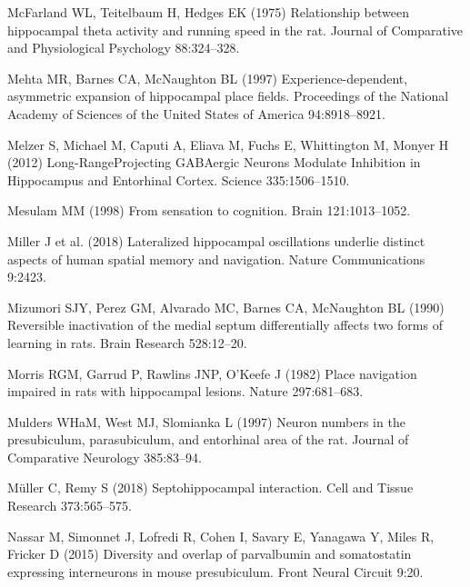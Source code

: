 \documentclass[
  12pt,
  a4paper,
  openany]{book}
\newlength{\cslhangindent}
\newlength{\cslentryspacingunit} %
\newenvironment{CSLReferences}[2] %
 {%
  \setlength{\parindent}{0pt}
  \ifodd #1
  \let\oldpar\par
  \def\par{\hangindent=\cslhangindent\oldpar}
  \fi
  \setlength{\parskip}{#2\cslentryspacingunit}
 }%
 {}
\begin{document}
\begin{CSLReferences}{1}{0}
\leavevmode{}%
McFarland WL, Teitelbaum H, Hedges EK (1975) Relationship between hippocampal theta activity and running speed in the rat. Journal of Comparative and Physiological Psychology 88:324--328.

\leavevmode{}%
Mehta MR, Barnes CA, McNaughton BL (1997) Experience-dependent, asymmetric expansion of hippocampal place fields. Proceedings of the National Academy of Sciences of the United States of America 94:8918--8921.

\leavevmode{}%
Melzer S, Michael M, Caputi A, Eliava M, Fuchs E, Whittington M, Monyer H (2012) Long-{Range}{\textendash}{Projecting} {GABAergic} {Neurons} {Modulate} {Inhibition} in {Hippocampus} and {Entorhinal} {Cortex}. Science 335:1506--1510.

\leavevmode{}%
Mesulam MM (1998) From sensation to cognition. Brain 121:1013--1052.

\leavevmode{}%
Miller J et al. (2018) Lateralized hippocampal oscillations underlie distinct aspects of human spatial memory and navigation. Nature Communications 9:2423.

\leavevmode{}%
Mizumori SJY, Perez GM, Alvarado MC, Barnes CA, McNaughton BL (1990) Reversible inactivation of the medial septum differentially affects two forms of learning in rats. Brain Research 528:12--20.

\leavevmode{}%
Morris RGM, Garrud P, Rawlins JNP, O'Keefe J (1982) Place navigation impaired in rats with hippocampal lesions. Nature 297:681--683.

\leavevmode{}%
Mulders WHaM, West MJ, Slomianka L (1997) Neuron numbers in the presubiculum, parasubiculum, and entorhinal area of the rat. Journal of Comparative Neurology 385:83--94.

\leavevmode{}%
Müller C, Remy S (2018) Septo{\textendash}hippocampal interaction. Cell and Tissue Research 373:565--575.

\leavevmode{}%
Nassar M, Simonnet J, Lofredi R, Cohen I, Savary E, Yanagawa Y, Miles R, Fricker D (2015) Diversity and overlap of parvalbumin and somatostatin expressing interneurons in mouse presubiculum. Front Neural Circuit 9:20.


\end{CSLReferences}
\end{document}
